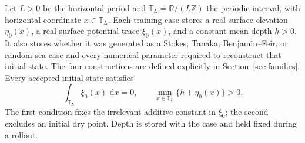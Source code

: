 \documentclass[11pt]{article}
\newcommand{\T}{\mathbb T}
\newcommand{\R}{\mathbb R}
\newcommand{\dd}{\,\mathrm d}
\begin{document}
Let $L>0$ be the horizontal period and
$\T_L=\R/(L\mathbb Z)$ the periodic interval, with horizontal coordinate
$x\in\T_L$.  Each training case stores a real surface elevation
$\eta_0(x)$, a real surface-potential trace $\xi_0(x)$, and a constant mean
depth $h>0$.  It also stores whether it was generated as a Stokes, Tanaka,
Benjamin--Feir, or random-sea case and every numerical parameter required to
reconstruct that initial state.  The four constructions are defined
explicitly in Section~\ref{sec:families}.
Every accepted initial state satisfies
\begin{equation}
  \int_{\T_L}\xi_0(x)\,\dd x=0,
  \qquad
  \min_{x\in\T_L}\{h+\eta_0(x)\}>0.
  \label{eq:case-gauge-and-depth}
\end{equation}
The first condition fixes the irrelevant additive constant in $\xi_0$; the
second excludes an initial dry point.  Depth is stored with the case and held
fixed during a rollout.
\end{document}
